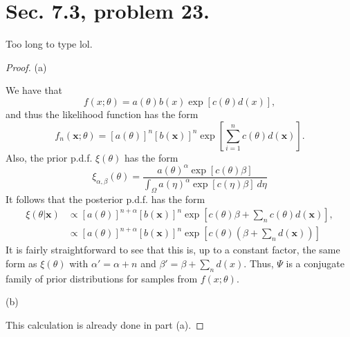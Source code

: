 \documentclass{article}
\newcommand{\pdf}{p.d.f. }
\newenvironment{hwproof}[1]
{
    #1
    \begin{proof}
}{
    \end{proof}
}
\begin{document}
\section{Sec. 7.3, problem 23.}
\begin{hwproof}
    {
        Too long to type lol.
    }
    (a)

    We have that
    \begin{equation*}
        f(x; \theta) = a(\theta)b(x)\exp[c(\theta)d(x)],
    \end{equation*}
    and thus the likelihood function has the form
    \begin{equation*}
        f_n(\bm{x}; \theta) = [a(\theta)]^n[b(\bm{x})]^n
        \exp\left[\sum_{i=1}^n c(\theta)d(\bm{x})\right].
    \end{equation*}
    Also, the prior \pdf $\xi(\theta)$ has the form
    \begin{equation*}
        \xi_{\alpha, \beta} (\theta) =
        \frac{a(\theta)^\alpha \exp[c(\theta)\beta]}{\int_\Omega a(\eta)^\alpha \exp[c(\eta)\beta] \ d\eta}
    \end{equation*}
    It follows that the posterior \pdf has the form
    \begin{align*}
        \xi(\theta | \bm{x}) & \propto
        [a(\theta)]^{n+\alpha}[b(\bm{x})]^n \exp\left[c(\theta)\beta + \sum_n c(\theta)d(\bm{x})\right],                                   \\
                             & \propto [a(\theta)]^{n+\alpha}[b(\bm{x})]^n \exp\left[c(\theta)\left(\beta + \sum_n d(\bm{x})\right)\right]
    \end{align*}
    It is fairly straightforward to see that this is, up to a constant factor, the same
    form as $\xi(\theta)$ with $\alpha' = \alpha + n$ and $\beta' = \beta + \sum_n d(x)$.
    Thus, $\Psi$ is a conjugate family of prior distributions
    for samples from $f(x; \theta)$.

    (b)

    This calculation is already done in part (a).

\end{hwproof}
\end{document}
